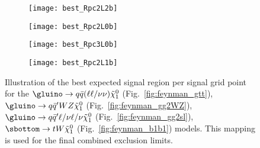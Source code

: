 

\begin{figure}[htb!]
\centering
\begin{subfigure}[t]{0.49\textwidth}\texttt{[image: best\_Rpc2L2b]}\caption{}\label{fig:best_Rpc2L2b}\end{subfigure}
\begin{subfigure}[t]{0.49\textwidth}\texttt{[image: best\_Rpc2L0b]}\caption{}\label{fig:best_Rpc2L0b}\end{subfigure}
\begin{subfigure}[t]{0.49\textwidth}\texttt{[image: best\_Rpc3L0b]}\caption{}\label{fig:best_Rpc3L0b}\end{subfigure}
\begin{subfigure}[t]{0.49\textwidth}\texttt{[image: best\_Rpc2L1b]}\caption{}\label{fig:best_Rpc2L1b}\end{subfigure}
\caption{Illustration of the best expected signal region per signal grid point for the 
$\gluino\to q\bar q (\ell\ell/\nu\nu)\tilde\chi^0_1$ (Fig.~\ref{fig:feynman_gtt}), $\gluino\to q\bar q' WZ\tilde\chi^0_1$ (Fig.~\ref{fig:feynman_gg2WZ}),
$\gluino\to q\bar q' \ell/\nu \ell/\nu \tilde\chi^0_1$ (Fig.~\ref{fig:feynman_gg2sl}), $\sbottom\to t W \tilde\chi^0_1$ (Fig.~\ref{fig:feynman_b1b1}) models. 
This mapping is used for the final combined exclusion limits.}
\label{fig:best_SR}
\end{figure}


\clearpage

